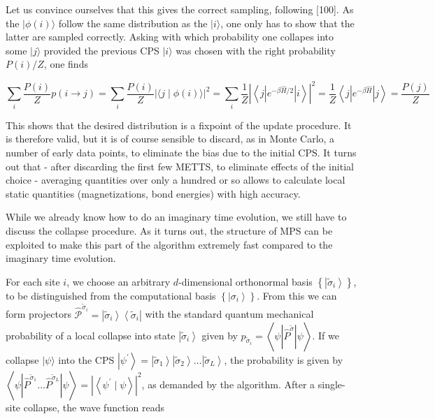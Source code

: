 \documentclass[12pt]{article}
\begin{document}
Let us convince ourselves that this gives the correct sampling, following [100]. As the $|\phi(i)\rangle$ follow the same distribution as the $|i\rangle$, one only has to show that the latter are sampled correctly. Asking with which probability one collapes into some $|j\rangle$ provided the previous CPS $|i\rangle$ was chosen with the right probability $P(i) / Z$, one finds


\begin{equation*}
\sum_{i} \frac{P(i)}{Z} p(i \rightarrow j)=\sum_{i} \frac{P(i)}{Z}|\langle j \mid \phi(i)\rangle|^{2}=\sum_{i} \frac{1}{Z}\left|\left\langle j\left|e^{-\beta \hat{H} / 2}\right| i\right\rangle\right|^{2}=\frac{1}{Z}\left\langle j\left|e^{-\beta \hat{H}}\right| j\right\rangle=\frac{P(j)}{Z} \tag{304}
\end{equation*}


This shows that the desired distribution is a fixpoint of the update procedure. It is therefore valid, but it is of course sensible to discard, as in Monte Carlo, a number of early data points, to eliminate the bias due to the initial CPS. It turns out that - after discarding the first few METTS, to eliminate effects of the initial choice - averaging quantities over only a hundred or so allows to calculate local static quantities (magnetizations, bond energies) with high accuracy.

While we already know how to do an imaginary time evolution, we still have to discuss the collapse procedure. As it turns out, the structure of MPS can be exploited to make this part of the algorithm extremely fast compared to the imaginary time evolution.

For each site $i$, we choose an arbitrary $d$-dimensional orthonormal basis $\left\{\left|\tilde{\sigma}_{i}\right\rangle\right\}$, to be distinguished from the computational basis $\left\{\left|\sigma_{i}\right\rangle\right\}$. From this we can form projectors $\hat{\mathcal{P}}^{\tilde{\sigma}_{i}}=\left|\tilde{\sigma}_{i}\right\rangle\left\langle\tilde{\sigma}_{i}\right|$ with the standard quantum mechanical probability of a local collapse into state $\left|\tilde{\sigma}_{i}\right\rangle$ given by $p_{\tilde{\sigma}_{i}}=\left\langle\psi\left|\hat{P}^{\tilde{\sigma}}\right| \psi\right\rangle$. If we collapse $|\psi\rangle$ into the CPS $\left|\psi^{\prime}\right\rangle=\left|\tilde{\sigma}_{1}\right\rangle\left|\tilde{\sigma}_{2}\right\rangle \ldots\left|\tilde{\sigma}_{L}\right\rangle$, the probability is given by $\left\langle\psi\left|\hat{P}^{\tilde{\sigma}_{1}} \ldots \hat{P}^{\tilde{\sigma}_{L}}\right| \psi\right\rangle=\left|\left\langle\psi^{\prime} \mid \psi\right\rangle\right|^{2}$, as demanded by the algorithm. After a single-site collapse, the wave function reads
\end{document}

